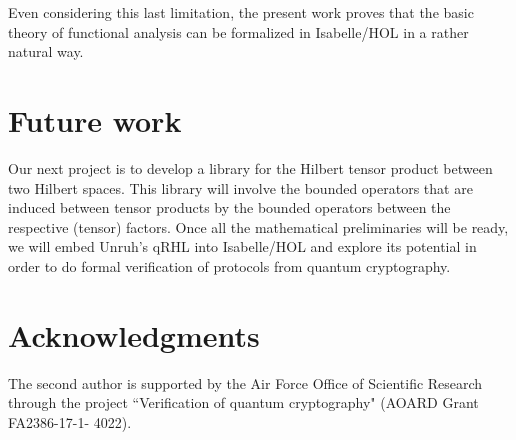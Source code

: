\documentclass[12pt]{article}
\theoremstyle{definition}
\begin{document}
Even considering this last limitation, the present work proves that the basic theory of functional analysis can be formalized in Isabelle/HOL in a rather natural way.

\section{Future work}
Our next project is to develop a library for the Hilbert tensor product between two Hilbert spaces. This library will involve the bounded operators that are induced between tensor products by the bounded operators between the respective (tensor) factors. Once all the mathematical preliminaries will be ready, we will embed Unruh's qRHL into Isabelle/HOL and explore its potential in order to do formal verification of protocols from quantum cryptography.


\section*{Acknowledgments}
The second author is supported by the Air Force Office of Scientific Research
through the project ``Verification of quantum cryptography" (AOARD Grant
FA2386-17-1- 4022).




\end{document}
